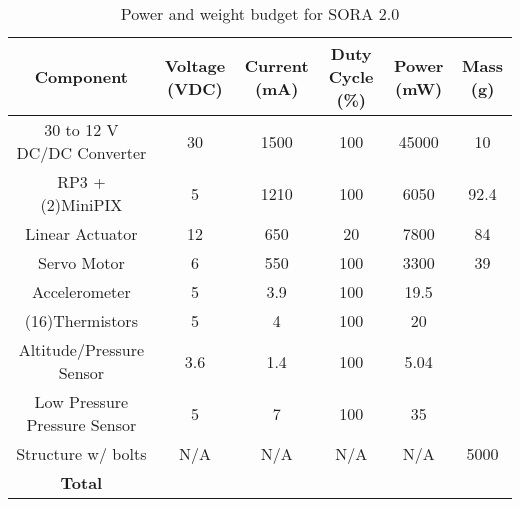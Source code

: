 \begin{table}[H]
  \centering
  \caption{Power and weight budget for SORA 2.0} 
  \label{tab:budget}
  \bigskip
  \begin{tabular}{cccccc}
    \hline
    \hline
    \multicolumn{1}{c}{\bfseries Component} & \multicolumn{1}{c}{\bfseries Voltage (VDC)} &  \multicolumn{1}{c}{\bfseries Current (mA)} & \multicolumn{1}{c}{\bfseries Duty Cycle (\%)} & \multicolumn{1}{c}{\bfseries Power (mW)} & \multicolumn{1}{c}{\bfseries Mass (g)} \\
    \hline
    30 to 12 V DC/DC Converter & 30 & 1500 & 100 & 45000 & 10 \\
    RP3 + (2)MiniPIX & 5 & 1210 & 100 & 6050 & 92.4 \\    
    Linear Actuator & 12 & 650 & 20 & 7800 & 84 \\
    Servo Motor & 6 & 550 & 100 & 3300 & 39 \\
    Accelerometer & 5 & 3.9 & 100 & 19.5 & \\
    (16)Thermistors & 5 & 4 & 100 & 20 & \\
    Altitude/Pressure Sensor & 3.6 & 1.4 & 100 & 5.04 & \\
    Low Pressure Pressure Sensor & 5 & 7 & 100 & 35 & \\   

    Structure w/ bolts & N/A & N/A & N/A & N/A & 5000 \\
    \hline
    \textbf{Total} & \textbf{} & \textbf{} & \textbf{} & \textbf{} & \textbf{} \\
    \hline
    \hline
  \end{tabular}
  \medskip
\end{table}